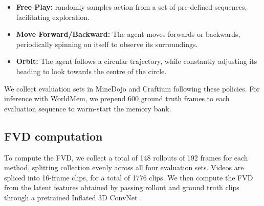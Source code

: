 \documentclass{article}
\theoremstyle{plain}
\theoremstyle{definition}
\theoremstyle{remark}
\begin{document}
\begin{itemize}
    \item \textbf{Free Play:} randomly samples action from a set of pre-defined sequences, facilitating exploration.
    \item \textbf{Move Forward/Backward:} The agent moves forwards or backwards, periodically spinning on itself to observe its surroundings.
    \item \textbf{Orbit:} The agent follows a circular trajectory, while constantly adjusting its heading to look towards the centre of the circle.
\end{itemize}

We collect evaluation sets in MineDojo and Craftium following these policies. For inference with WorldMem, we prepend 600 ground truth frames to each evaluation sequence to warm-start the memory bank.

\subsection{FVD computation}

To compute the FVD, we collect a total of 148 rollouts of 192 frames for each method, splitting collection evenly across all four evaluation sets. Videos are spliced into 16-frame clips, for a total of 1776 clips. We then compute the FVD from the latent features obtained by passing rollout and ground truth clips through a pretrained Inflated 3D ConvNet \citep{carreira2017quo}.
\end{document}
